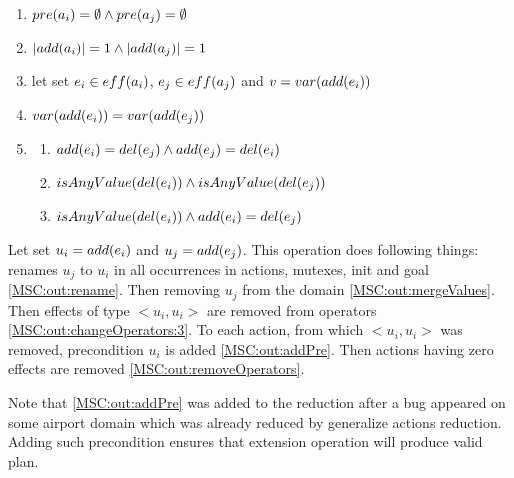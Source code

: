 	
	\begin{enumerate}
		\item $pre(a_i) = \emptyset \land pre(a_j) = \emptyset $ \label{MSC:in:first}
		\item $|add(a_i)| = 1 \land |add(a_j)| = 1 $ \label{MSC:in:second}
		\item let set $e_i \in eff(a_i)$, $e_j \in eff(a_j)$ and $v = var(add(e_i))$
		\item $var(add(e_i)) = var(add(e_j))$ \label{MSC:in:fourth:commonVariable}
		\item	\begin{enumerate}
			\item $add(e_i) = del(e_j) \land add(e_j) = del(e_i)$ \label{MSC:in:third:common}
			\item $isAnyValue(del(e_i)) \land isAnyValue(del(e_j)) $ \label{MSC:in:third:2any}
			\item $isAnyValue(del(e_i)) \land add(e_i) = del(e_j)$ \label{MSC:in:third:1any}
		\end{enumerate}
	\end{enumerate}
	
	Let set $u_i = add(e_i)$ and $u_j = add(e_j)$. This operation does following things: renames $u_j$ to $u_i$ in all occurrences in actions, mutexes, init and goal \ref{MSC:out:rename}. Then removing $u_j$ from the domain \ref{MSC:out:mergeValues}. Then effects of type $<u_i, u_i>$ are removed from operators \ref{MSC:out:changeOperators:3}. To each action, from which $<u_i, u_i>$ was removed, precondition $u_i$ is added \ref{MSC:out:addPre}. Then actions having zero effects are removed \ref{MSC:out:removeOperators}.
	
	Note that \ref{MSC:out:addPre} was added to the reduction after a bug appeared on some airport domain which was already reduced by generalize actions reduction. Adding such precondition ensures that extension operation will produce valid plan.
	
